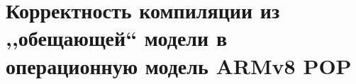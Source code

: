 \chapter{Корректность компиляции из ,,обещающей`` модели в операционную модель ARMv8 POP} \label{sec:armpop}

